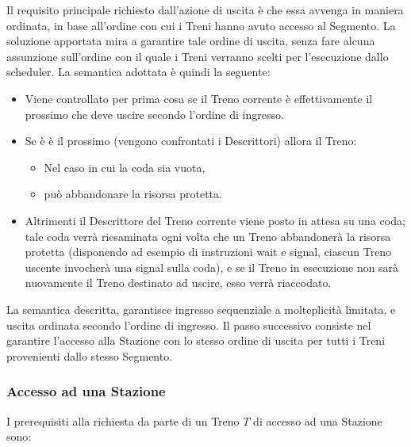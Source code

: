 \begin{description}
			Il requisito principale richiesto dall'azione di uscita è che essa avvenga in maniera ordinata, in base all'ordine con cui i Treni hanno avuto accesso al Segmento. La soluzione apportata mira a garantire tale ordine di uscita, senza fare alcuna assunzione sull'ordine con il quale i Treni verranno scelti per l'esecuzione dallo scheduler. La semantica adottata è quindi la seguente:
			\begin{itemize}
				 \item Viene controllato per prima cosa se il Treno corrente è effettivamente il prossimo che deve uscire secondo l'ordine di ingresso.
				 \item Se è è il prossimo (vengono confrontati i Descrittori) allora il Treno:
				 	\begin{itemize} 
				 		\item Nel caso in cui la coda sia vuota, 
				 		\item può abbandonare la risorsa protetta.
				 	\end{itemize} 
				 \item Altrimenti il Descrittore del Treno corrente viene posto in attesa su una coda; tale coda verrà riesaminata ogni volta che un Treno abbandonerà la risorsa protetta (disponendo ad esempio di instruzioni wait e signal, ciascun Treno uscente invocherà una signal sulla coda), e se il Treno in esecuzione non sarà nuovamente il Treno destinato ad uscire, esso verrà riaccodato. 
			\end{itemize}
		\end {description}  
	
	La semantica descritta, garantisce ingresso sequenziale a molteplicità limitata, e uscita ordinata secondo l'ordine di ingresso. Il passo successivo consiste nel garantire l'accesso alla Stazione con lo stesso ordine di uscita per tutti i Treni provenienti dallo stesso Segmento.


		\subsubsection{Accesso ad una Stazione}
		
		I prerequisiti alla richiesta da parte di un Treno $T$ di accesso ad una Stazione sono:
		
